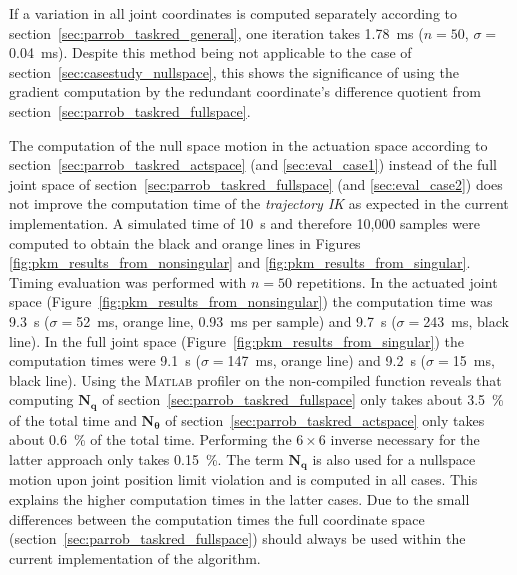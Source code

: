 \documentclass[a4paper,twoside]{article}
\begin{document}
If a variation in all joint coordinates is computed separately according to section~\ref{sec:parrob_taskred_general}, one iteration takes \SI{1.78}{\milli\second} ($n{=}50$, $\sigma{=}$\SI{0.04}{\milli\second}). %
Despite this method being not applicable to the case of section~\ref{sec:casestudy_nullspace}, this shows the significance of using the gradient computation by the  redundant coordinate's difference quotient from  section~\ref{sec:parrob_taskred_fullspace}.

The computation of the null space motion in the actuation space according to section~\ref{sec:parrob_taskred_actspace} (and \ref{sec:eval_case1}) instead of the full joint space of section~\ref{sec:parrob_taskred_fullspace} (and \ref{sec:eval_case2}) does not improve the computation time of the \emph{trajectory IK} as expected in the current implementation.
A simulated time of \SI{10}{\second} and therefore 10,000 samples were computed to obtain the black and orange lines in Figures \ref{fig:pkm_results_from_nonsingular} and \ref{fig:pkm_results_from_singular}.
Timing evaluation was performed with $n{=}50$ repetitions.
In the actuated joint space (Figure~\ref{fig:pkm_results_from_nonsingular}) the computation time was \SI{9.3}{\second} ($\sigma{=}$\SI{52}{\milli\second}, orange line, \SI{0.93}{\milli\second} per sample) and \SI{9.7}{\second} ($\sigma{=}$\SI{243}{\milli\second}, black line).
In the full joint space (Figure~\ref{fig:pkm_results_from_singular}) the computation times were \SI{9.1}{\second} ($\sigma{=}$\SI{147}{\milli\second}, orange line) and \SI{9.2}{\second} ($\sigma{=}$\SI{15}{\milli\second}, black line).
Using the \textsc{Matlab} profiler on the non-compiled function reveals that computing $\bm{N}_{\bm{q}}$ of section~\ref{sec:parrob_taskred_fullspace} only takes about \SI{3.5}{\percent} of the total time and $\bm{N}_{\bm{\theta}}$ of section~\ref{sec:parrob_taskred_actspace} only takes about \SI{0.6}{\percent} of the total time.
Performing the $6 \times 6$ inverse necessary for the latter approach only takes \SI{0.15}{\percent}.
The term $\bm{N}_{\bm{q}}$ is also used for a nullspace motion upon joint position limit violation and is computed in all cases.
This explains the higher computation times in the latter cases.
Due to the small differences between the computation times the full coordinate space (section~\ref{sec:parrob_taskred_fullspace}) should always be used within the current implementation of the algorithm.
\end{document}
